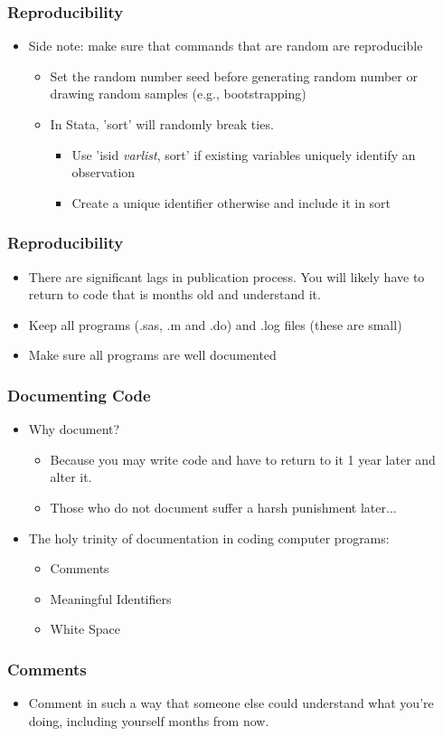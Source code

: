 \documentclass[english,xcolor=dvipsnames]{beamer}
\newcommand{\bi}{\begin{itemize}}
\newcommand{\ei}{\end{itemize}}
\begin{document}
\begin{frame}
\frametitle{Reproducibility}

   \bi 
   \item Side note: make sure that commands that are random are reproducible
      \bi 
      \item Set the random number seed before generating random number or drawing random samples (e.g., bootstrapping)
      \item In Stata, 'sort' will randomly break ties.
         \bi 
         \item Use 'isid  \emph{varlist}, sort' if existing variables uniquely identify an observation
         \item Create a unique identifier otherwise and include it in sort
         \ei
      \ei
   \ei
\end{frame}

\begin{frame}
\frametitle{Reproducibility}

   \bi 
   \item There are significant lags in publication process. You will likely have to return to code that is months old and understand it.
   \item Keep all programs (.sas, .m and .do) and .log files (these are small)
   \item Make sure all programs are well documented
   \ei
\end{frame}

\begin{frame}
\frametitle{Documenting Code}

   \bi 
   \item Why document? 
      \bi 
      \item Because you may write code and have to return to it 1 year later and alter it. 
      \item Those who do not document suffer a harsh punishment later...
      \ei
   \item The holy trinity of documentation in coding computer programs:
      \bi 
      \item Comments
      \item Meaningful Identifiers
      \item White Space
      \ei
   \ei
\end{frame}

\begin{frame}
\frametitle{Comments}

   \bi 
   \item Comment in such a way that someone else could understand what you're doing, including yourself months from now.
   \ei
\end{frame}
\end{document}
